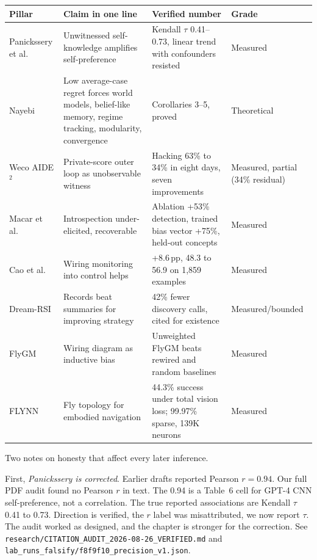 \begin{center}
\small
\begin{tabular}{p{3.2cm}p{3.2cm}p{4.0cm}p{2.4cm}}
\toprule
Pillar & Claim in one line & Verified number & Grade \\
\midrule
Panickssery et al.\ \cite{panickssery2024} & Unwitnessed self-knowledge amplifies self-preference & Kendall $\tau$ 0.41--0.73, linear trend with confounders resisted & Measured \\
Nayebi \cite{nayebi2026} & Low average-case regret forces world models, belief-like memory, regime tracking, modularity, convergence & Corollaries 3--5, proved & Theoretical \\
Weco AIDE$^{2}$ \cite{weco2026} & Private-score outer loop as unobservable witness & Hacking 63\% to 34\% in eight days, seven improvements & Measured, partial (34\% residual) \\
Macar et al.\ \cite{macar2026} & Introspection under-elicited, recoverable & Ablation +53\% detection, trained bias vector +75\%, held-out concepts & Measured \\
Cao et al.\ \cite{cao2026} & Wiring monitoring into control helps & +8.6\,pp, 48.3 to 56.9 on 1,859 examples & Measured \\
Dream-RSI \cite{dreamrsi2026} & Records beat summaries for improving strategy & 42\% fewer discovery calls, cited for existence & Measured/bounded \\
FlyGM \cite{flygm2026} & Wiring diagram as inductive bias & Unweighted FlyGM beats rewired and random baselines & Measured \\
FLYNN \cite{flynn2026} & Fly topology for embodied navigation & 44.3\% success under total vision loss; 99.97\% sparse, 139K neurons & Measured \\
\bottomrule
\end{tabular}
\end{center}

Two notes on honesty that affect every later inference.

First, \textit{Panickssery is corrected}. Earlier drafts reported Pearson $r=0.94$. Our full PDF audit found no Pearson $r$ in text. The 0.94 is a Table~6 cell for GPT-4 CNN self-preference, not a correlation. The true reported associations are Kendall $\tau$ 0.41 to 0.73. Direction is verified, the $r$ label was misattributed, we now report $\tau$. The audit worked as designed, and the chapter is stronger for the correction. See \texttt{research/CITATION\_AUDIT\_2026-08-26\_VERIFIED.md} and \texttt{lab\_runs\_falsify/f8f9f10\_precision\_v1.json}.


